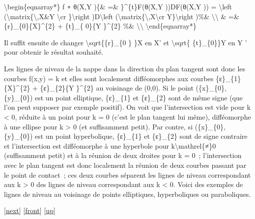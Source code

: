 \documentclass[]{article}
\begin{document}
\textbackslash{}begin\{eqnarray*\} f ∘ θ(X,Y )\{\& =\&
\}\^{}\{t\}F(θ(X,Y ))DF(θ(X,Y )) = \textbackslash{}left
(\textbackslash{}matrix\{\textbackslash{},X\&Y \textbackslash{}cr
\}\textbackslash{}right )D\textbackslash{}left
(\textbackslash{}matrix\{\textbackslash{},X\textbackslash{}cr
Y\}\textbackslash{}right )\%\& \textbackslash{}\textbackslash{} \& =\&
\{r\}\_\{0\}\{X\}\^{}\{2\} + \{t\}\_\{ 0\}\{Y \}\^{}\{2\} \%\&
\textbackslash{}\textbackslash{} \textbackslash{}end\{eqnarray*\}

Il suffit ensuite de changer \textbackslash{}sqrt\{\textbar{}\{r\}\_\{0
\} \textbar{}\}X en X' et \textbackslash{}sqrt\{
\textbar{}\{t\}\_\{0\}\textbar{}\}Y en Y ' pour obtenir le résultat
souhaité.

Les lignes de niveau de la nappe dans la direction du plan tangent sont
donc les courbes f(x,y) = k et elles sont localement difféomorphes aux
courbes \{ε\}\_\{1\}\{X\}\^{}\{2\} + \{ε\}\_\{2\}\{Y \}\^{}\{2\} au
voisinage de (0,0). Si le point (\{x\}\_\{0\},\{y\}\_\{0\}) est un point
elliptique, \{ε\}\_\{1\} et \{ε\}\_\{2\} sont de même signe (que l'on
peut supposer par exemple positif). On voit que l'intersection est vide
pour k \textless{} 0, réduite à un point pour k = 0 (c'est le plan
tangent lui même), difféomorphe à une ellipse pour k \textgreater{} 0
(et suffisamment petit). Par contre, si (\{x\}\_\{0\},\{y\}\_\{0\}) est
un point hyperbolique, \{ε\}\_\{1\} et \{ε\}\_\{2\} sont de signe
contraire et l'intersection est difféomorphe à une hyperbole pour
k\textbackslash{}mathrel\{≠\}0 (suffisamment petit) et à la réunion de
deux droites pour k = 0~; l'intersection avec le plan tangent est donc
localement la réunion de deux courbes passant par le point de contact~;
ces deux courbes séparent les lignes de niveau correspondant aux k
\textgreater{} 0 des lignes de niveau correspondant aux k \textless{} 0.
Voici des exemples de lignes de niveau au voisinage de points
elliptiques, hyperboliques ou paraboliques.

{[}\href{coursse101.html}{next}{]} {[}\href{coursse100.html}{front}{]}
{[}\href{coursch20.html\#coursse100.html}{up}{]}
\end{document}

